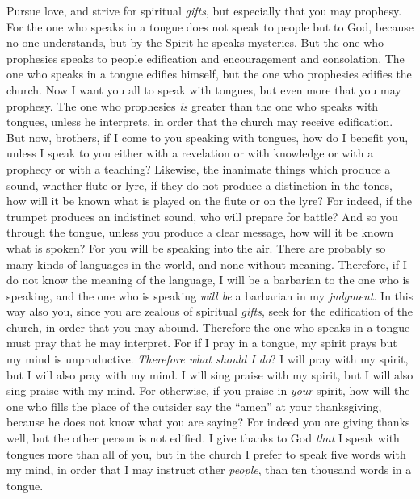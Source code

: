 \begin{biblechapter} %
 Pursue love, and strive for spiritual \textit{gifts}, but especially that you may prophesy.
\verse For the one who speaks in a tongue does not speak to people but to God, because no one understands, but by the Spirit he speaks mysteries.
\verse But the one who prophesies speaks to people edification and encouragement and consolation.
\verse The one who speaks in a tongue edifies himself, but the one who prophesies edifies the church.
\verse Now I want you all to speak with tongues, but even more that you may prophesy. The one who prophesies \textit{is} greater than the one who speaks with tongues, unless he interprets, in order that the church may receive edification.
\verse But now, brothers, if I come to you speaking with tongues, how do I benefit you, unless I speak to you either with a revelation or with knowledge or with a prophecy or with a teaching?
\verse Likewise, the inanimate things which produce a sound, whether flute or lyre, if they do not produce a distinction in the tones, how will it be known what is played on the flute or on the lyre?
\verse For indeed, if the trumpet produces an indistinct sound, who will prepare for battle?
\verse And so you through the tongue, unless you produce a clear message, how will it be known what is spoken? For you will be speaking into the air.
\verse There are probably so many kinds of languages in the world, and none without meaning.
\verse Therefore, if I do not know the meaning of the language, I will be a barbarian to the one who is speaking, and the one who is speaking \textit{will be} a barbarian in my \textit{judgment}.
\verse In this way also you, since you are zealous of spiritual \textit{gifts}, seek for the edification of the church, in order that you may abound.
\verse Therefore the one who speaks in a tongue must pray that he may interpret.
\verse For if I pray in a tongue, my spirit prays but my mind is unproductive.
\verse \textit{Therefore what should I do}? I will pray with my spirit, but I will also pray with my mind. I will sing praise with my spirit, but I will also sing praise with my mind.
\verse For otherwise, if you praise in \textit{your} spirit, how will the one who fills the place of the outsider say the “amen” at your thanksgiving, because he does not know what you are saying?
\verse For indeed you are giving thanks well, but the other person is not edified.
\verse I give thanks to God \textit{that} I speak with tongues more than all of you,
\verse but in the church I prefer to speak five words with my mind, in order that I may instruct other \textit{people}, than ten thousand words in a tongue.

\end{biblechapter}

